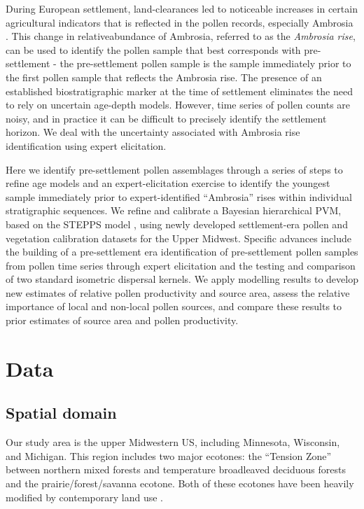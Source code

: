 \documentclass[12pt]{article}
\begin{document}
During European settlement, land-clearances led to noticeable
increases in certain agricultural indicators that is reflected in the
pollen records, especially Ambrosia \citep{mcandrews1988human}. This
change in relativeabundance of Ambrosia, referred to as the
\textit{Ambrosia rise}, can be used to identify the pollen sample that
best corresponds with pre-settlement - the pre-settlement pollen
sample is the sample immediately prior to the first pollen sample that
reflects the Ambrosia rise. The presence of an established
biostratigraphic marker at the time of settlement eliminates the need
to rely on uncertain age-depth models. However, time series of pollen
counts are noisy, and in practice it can be difficult to precisely
identify the settlement horizon. We deal with the uncertainty
associated with Ambrosia rise identification using expert elicitation.

Here we identify pre-settlement pollen assemblages through a series of
steps to refine age models and an expert-elicitation exercise to
identify the youngest sample immediately prior to expert-identified
“Ambrosia” rises within individual stratigraphic sequences. We refine
and calibrate a Bayesian hierarchical PVM, based on the STEPPS model
\citep{paciorek2009mapping}, using newly developed settlement-era
pollen and vegetation calibration datasets for the Upper
Midwest. Specific advances include the building of a pre-settlement
era identification of pre-settlement pollen samples from pollen time
series through expert elicitation and the testing and comparison of
two standard isometric dispersal kernels. We apply modelling results
to develop new estimates of relative pollen productivity and source
area, assess the relative importance of local and non-local pollen
sources, and compare these results to prior estimates of source area
and pollen productivity.

\section{Data}

\subsection{Spatial domain}

Our study area is the upper Midwestern US, including Minnesota,
Wisconsin, and Michigan.  This region includes two major ecotones: the
``Tension Zone'' between northern mixed forests and temperature
broadleaved deciduous forests and the prairie/forest/savanna ecotone.
Both of these ecotones have been heavily modified by contemporary land
use \citep{goring2015b}.
\end{document}
